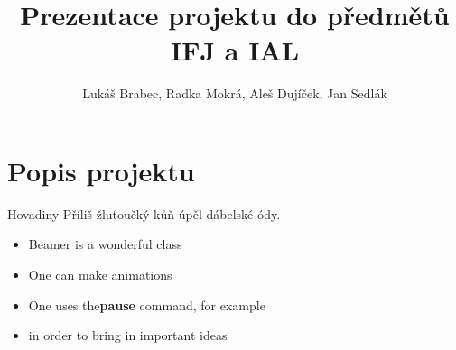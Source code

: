 \documentclass{beamer}
\title[Prezentace do IFJ a IAL]{Prezentace projektu do předmětů IFJ a IAL}
\author{Lukáš Brabec, Radka Mokrá, Aleš Dujíček, Jan Sedlák}
\begin{document}
\begin{frame}
  \maketitle
\end{frame}
\section{Popis projektu}
\begin{frame}{Hovadiny}
  Příliš žluťoučký kůň úpěl dábelské ódy.
  \begin{itemize}
    \item Beamer is a wonderful class
    \item One can make animations
    \item One uses the\textbf{pause} command, for example
    \item in order to bring in important ideas
  \end{itemize}
\end{frame}
\end{document}
